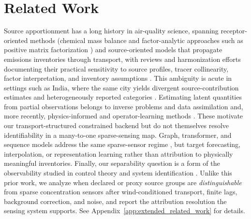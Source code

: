 \section{Related Work}
\label{sec:related_work}

Source apportionment has a long history in air-quality science, spanning
receptor-oriented methods (chemical mass balance and factor-analytic approaches
such as positive matrix factorization
\citep{watson2002receptor,paatero1994positive,hopke2016review}) and
source-oriented models that propagate emissions inventories through transport,
with reviews and harmonization efforts documenting their practical sensitivity to
source profiles, tracer collinearity, factor interpretation, and inventory
assumptions
\citep{viana2008source,belis2013critical,belis2019european,mircea2020european,hopke2020global}.
This ambiguity is acute in settings such as India, where the same city yields
divergent source-contribution estimates and heterogeneously reported categories
\citep{pant2012critical,karagulian2015contributions}.
Estimating latent quantities from partial observations belongs to inverse
problems and data assimilation
\citep{tarantola2005inverse,engl1996regularization,wang2023kalman,carrassi2018data}
and, more recently, physics-informed and operator-learning methods
\citep{raissi2019physics,li2024physics,li2020fourier,bhardwaj2025fieldformer}.
These motivate our transport-structured constrained backend but do not themselves
resolve identifiability in a many-to-one sparse-sensing map.
Graph, transformer, and sequence models address the same sparse-sensor regime
\citep{li2017diffusion,yu2017spatio,wu2019graph,chen2023group,iyer2022modeling,bhardwaj2025comprehensive},
but target forecasting, interpolation, or representation learning rather than
attribution to physically meaningful inventories.  Finally, our separability
question is a form of the observability studied in control theory and system
identification \citep{chen1984linear,ljung1987theory,banks2012estimation,colton1990inverse}.
Unlike this prior work, we analyze when declared or proxy source groups are
\emph{distinguishable} from sparse concentration sensors after wind-conditioned
transport, finite lags, background correction, and noise, and report the
attribution resolution the sensing system supports.  See Appendix~\ref{app:extended_related_work}
for details.
